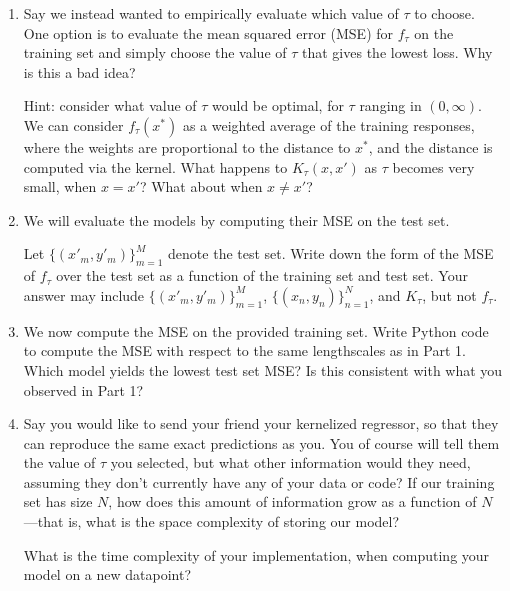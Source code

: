 \documentclass[submit]{harvardml}
\begin{document}
\begin{problem}
\begin{enumerate}
\item Say we instead wanted to empirically evaluate which value of $\tau$ to choose. One option is to evaluate the mean squared error (MSE) for $f_{\tau}$ on the training set and simply choose the value of $\tau$ that gives the lowest loss. Why is this a bad idea?
    
Hint: consider what value of $\tau$ would be optimal, for $\tau$ ranging in $(0, \infty)$. We can consider $f_\tau(x^*)$ as a weighted average of the training responses, where the weights are proportional to the distance to $x^*$, and the distance is computed via the kernel. What happens to $K_\tau(x, x')$ as $\tau$ becomes very small, when $x = x'$? What about when $x \neq x'$?

\item We will evaluate the models by computing their MSE on the test set. 

Let $\{(x'_m, y'_m)\}_{m = 1} ^M$ denote the test set. Write down the form of the MSE of $f_\tau$ over the test set as a function of the training set and test set. Your answer may include $\{(x'_m, y'_m)\}_{m = 1} ^M$, $\{(x_n, y_n)\}_{n = 1} ^N$, and $K_\tau$, but not $f_\tau$.

\item We now compute the MSE on the provided training set. Write Python code to compute the MSE with respect to the same lengthscales as in Part 1. Which model yields the lowest test set MSE? Is this consistent with what you observed in Part 1?

\item 
Say you would like to send your friend your kernelized regressor, so that they can reproduce the same exact predictions as you. You of course will tell them the value of $\tau$ you selected, but what other information would they need, assuming they don't currently have any of your data or code? If our training set has size $N$, how does this amount of information grow as a function of $N$—that is, what is the space complexity of storing our model?

What is the time complexity of your implementation, when computing your model on a new datapoint? 
\end{enumerate}

\end{problem}

\newpage

\end{document}
